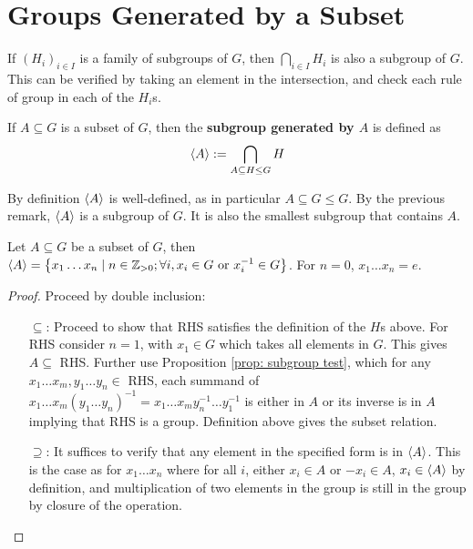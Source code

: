 \documentclass{article}
\begin{document}
\clearpage
\section{Groups Generated by a Subset}

\begin{remark}
    If $(H_i)_{i \in I}$ is a family of subgroups of $G$, then $\bigcap_{i \in I} H_i$ is also a subgroup of $G$. This can be verified by taking an element in the intersection, and check each rule of group in each of the $H_i$s.
\end{remark}

\begin{definition}
    If $A \subseteq G$ is a subset of $G$, then the \textbf{subgroup generated by $A$} is defined as
    \[
        \left\langle A \right\rangle := \bigcap_{A \subseteq H \leq G} H
    \]
\end{definition}

\begin{remark}
    By definition $\left\langle A \right\rangle$ is well-defined, as in particular $A \subseteq G \leq G$. By the previous remark, $\left\langle A \right\rangle$ is a subgroup of $G$. It is also the smallest subgroup that contains $A$.
\end{remark}

\begin{proposition}\label{prop: explicit presentation of generated subgroup}
    Let $A \subseteq G$ be a subset of $G$, then $\left\langle A \right\rangle = \left\{ x_1\dots x_n \mid n \in \mathbb{Z}_{>0}; \forall i, x_i \in G \text{ or } x_i^{-1} \in G \right\}$. For $n = 0$, $x_1 \dots x_n = e$. 
\end{proposition}

\begin{proof}
    Proceed by double inclusion:
    \begin{enumerate}
        \item[$\subseteq$:] Proceed to show that RHS satisfies the definition of the $H$s above. For RHS consider $n = 1$, with $x_1 \in G$ which takes all elements in $G$. This gives $A \subseteq$ RHS. Further use Proposition \ref{prop: subgroup test}, which for any $x_1\dots x_m, y_1\dots y_n \in$ RHS, each summand of $x_1 \dots x_m (y_1 \dots y_n)^{-1} = x_1 \dots x_m y_n^{-1} \dots y_1^{-1}$ is either in $A$ or its inverse is in $A$ implying that RHS is a group. Definition above gives the subset relation.
        \item[$\supseteq$:] It suffices to verify that any element in the specified form is in $\left\langle A \right\rangle$. This is the case as for $x_1\dots x_n$ where for all $i$, either $x_i \in A$ or $-x_i \in A$, $x_i \in \left\langle A \right\rangle$ by definition, and multiplication of two elements in the group is still in the group by closure of the operation.  
    \end{enumerate}
\end{proof}
\end{document}
